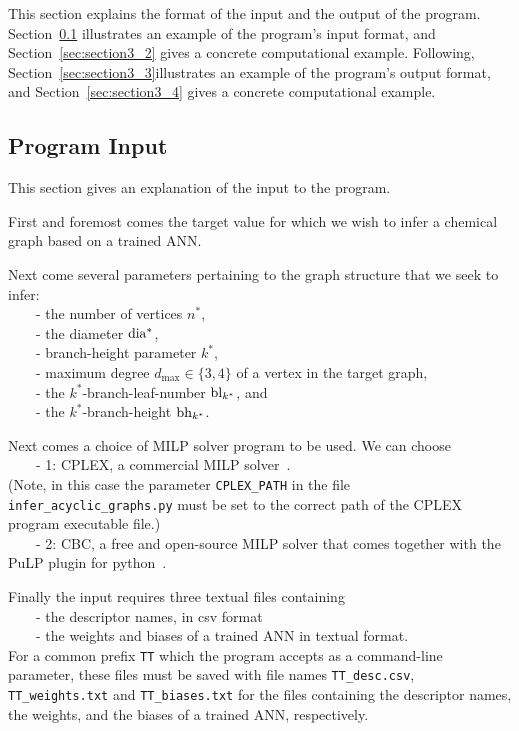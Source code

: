 \documentclass[11pt, titlepage, dvipdfmx, twoside]{article}
\begin{document}
This section explains the format of the input and the output of the program.
Section~\ref{sec:section3_1} illustrates an example of the program's input format,
and Section~\ref{sec:section3_2} gives a concrete computational example.
Following, Section~\ref{sec:section3_3}illustrates an example of the program's output format,
and Section~\ref{sec:section3_4} gives a concrete computational example.


\subsection{Program Input}
\label{sec:section3_1}

This section gives an explanation of the input to the program.

First and foremost comes the target value for which we wish to infer 
a chemical graph based on a trained ANN.

Next come several parameters pertaining to the 
graph structure that we seek to infer: \\
~~~~- the number of vertices $n^*$, \\
~~~~- the diameter ${\rm dia^*}$, \\
~~~~- branch-height parameter $k^*$, \\
~~~~- maximum degree $d_{\max} \in \{3, 4\}$ of a vertex in the target graph,\\
~~~~- the $k^*$-branch-leaf-number ${\rm bl}_{k^*}$, and \\
~~~~- the $k^*$-branch-height ${\rm bh}_{k^*}$.

Next comes a choice of MILP solver program to be used.
We can choose \\
~~~~- 1: CPLEX, a commercial MILP solver~\cite{cplex}. \\
(Note, in this case the parameter {\tt CPLEX\_PATH} in the file {\tt infer\_acyclic\_graphs.py}
must be set to the correct path of the CPLEX program executable file.) \\
~~~~- 2: CBC, a free and open-source MILP solver that comes together with the PuLP plugin for python~\cite{PuLP1}.

Finally
the input requires three textual files containing \\
~~~~- the descriptor names, in csv format \\
~~~~- the weights and biases of a trained ANN in textual format.\\
For a common prefix {\tt TT} which the program accepts as a command-line parameter,
these files must be saved with file names {\tt TT\_desc.csv}, 
{\tt TT\_weights.txt} and {\tt TT\_biases.txt} for the files containing
the descriptor names, the weights, and the biases of a trained ANN, respectively.
\end{document}
